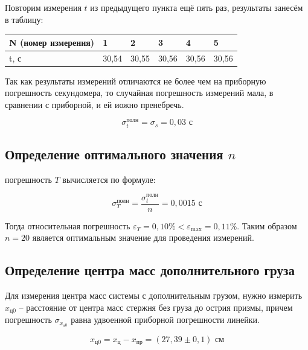 \documentclass[a4paper,12pt]{article}
\begin{document}
Повторим измерения $t$ из предыдущего пункта ещё пять раз, результаты занесём в таблицу:

\begin{table}[!ht]
    \centering
    \begin{tabular}{|l|l|l|l|l|l|}
    \hline
        N (номер измерения) & 1 & 2 & 3 & 4 & 5 \\ \hline
        t, с & 30,54 & 30,55 & 30,56 & 30,56 & 30,56 \\ \hline
    \end{tabular}
\end{table}

Так как результаты измерений отличаются не более чем на приборную погрешность секундомера, то случайная погрешность измерений мала, в сравнении с приборной, и ей иожно пренебречь.

\begin{equation}
    \sigma_t^\text{полн} = \sigma_s = 0,03 \text{ с}
\end{equation}

\subsection{Определение оптимального значения $n$}

погрешность $T$ вычисляется по формуле:

\begin{equation}
    \sigma_T^\text{полн} = \frac{\sigma_t^\text{полн}}{n} = 0,0015 \text{ с}
\end{equation}

Тогда относительная погрешность $\varepsilon_T = 0,10 \% < \varepsilon_\text{max} = 0,11 \%$. Таким образом $n = 20$ является оптимальным значение для проведения измерений.

\subsection{Определение центра масс дополнительного груза}

Для измерения центра масс системы с дополнительным грузом, нужно измерить $x_\text{ц0}$ -- расстояние от центра масс стержня без груза до острия призмы, причем погрешность $\sigma_{x_\text{ц0}}$ равна удвоенной приборной погрешности линейки.

\begin{equation}
    x_\text{ц0} = x_\text{ц} - x_\text{пр} = (27,39 \pm 0,1) \text{ см}
\end{equation}
\end{document}
